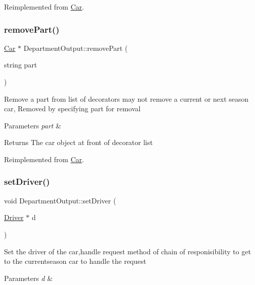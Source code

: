 Reimplemented from \hyperlink{classCar_a5859a9475be0c26341ca4f3acf23a2ea}{Car}.

\mbox{\label{classDepartmentOutput_a8bd91d321113668938ecb8fb549d972c}} 
\subsubsection{\texorpdfstring{remove\+Part()}{removePart()}}
{\footnotesize\ttfamily \hyperlink{classCar}{Car} $\ast$ Department\+Output\+::remove\+Part (\begin{DoxyParamCaption}\item[{string}]{part }\end{DoxyParamCaption})\hspace{0.3cm}{\ttfamily [virtual]}}

Remove a part from list of decorators may not remove a current or next season car, Removed by specifying part for removal 
\begin{DoxyParams}{Parameters}
{\em part} & \\
\hline
\end{DoxyParams}
\begin{DoxyReturn}{Returns}
The car object at front of decorator list 
\end{DoxyReturn}


Reimplemented from \hyperlink{classCar_a54018ac7e84e79c8bfc1a8fba5e45b16}{Car}.

\mbox{\label{classDepartmentOutput_aa045362e5763d57a2c888b98c677773c}} 
\subsubsection{\texorpdfstring{set\+Driver()}{setDriver()}}
{\footnotesize\ttfamily void Department\+Output\+::set\+Driver (\begin{DoxyParamCaption}\item[{\hyperlink{classDriver}{Driver} $\ast$}]{d }\end{DoxyParamCaption})\hspace{0.3cm}{\ttfamily [virtual]}}

Set the driver of the car,handle request method of chain of responisibility to get to the currentseason car to handle the request 
\begin{DoxyParams}{Parameters}
{\em d} & \\
\hline
\end{DoxyParams}


